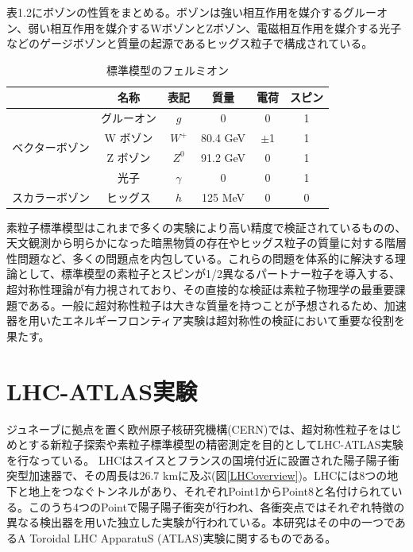 表1.2にボゾンの性質をまとめる。ボゾンは強い相互作用を媒介するグルーオン、弱い相互作用を媒介するWボゾンとZボゾン、電磁相互作用を媒介する光子などのゲージボゾンと質量の起源であるヒッグス粒子で構成されている。

\begin{table}[]
    \centering
    \caption[標準模型のフェルミオン]{標準模型のフェルミオン}
    \label{tab:bozon}

    \begin{tabular}{cccccc}
    \hline
                                                                                           & 名称        & 表記           & 質量                 & 電荷   & スピン \\ 
    \hline\hline
    \multicolumn{1}{c|}{\multirow{4}{*}{ベクターボゾン}}  & グルーオン       & $g$            & 0            & 0 & 1 \\
    \multicolumn{1}{c|}{}                                            &   W ボゾン     & $W^{+}$            & 80.4 GeV            & $\pm$1 & 1 \\ 
    \multicolumn{1}{c|}{}                       & Z ボゾン      & $Z^{0}$           & 91.2 GeV            & 0 & 1 \\
    \multicolumn{1}{c|}{}                                            & 光子    & $\gamma$            & 0             & 0 & 1 \\
    \hline\hline
    \multicolumn{1}{c|}{\multirow{1}{*}{スカラーボゾン}}  & ヒッグス  & $h$    & 125 MeV     & 0    & 0 \\
    \hline
    \end{tabular}
\end{table}


素粒子標準模型はこれまで多くの実験により高い精度で検証されているものの、天文観測から明らかになった暗黒物質の存在やヒッグス粒子の質量に対する階層性問題など、多くの問題点を内包している。これらの問題を体系的に解決する理論として、標準模型の素粒子とスピンが1/2異なるパートナー粒子を導入する、超対称性理論が有力視されており、その直接的な検証は素粒子物理学の最重要課題である。一般に超対称性粒子は大きな質量を持つことが予想されるため、加速器を用いたエネルギーフロンティア実験は超対称性の検証において重要な役割を果たす。
\section{LHC-ATLAS実験}
\label{sec_intro_atlas}

ジュネーブに拠点を置く欧州原子核研究機構(CERN)では、超対称性粒子をはじめとする新粒子探索や素粒子標準模型の精密測定を目的としてLHC-ATLAS実験を行なっている。
LHCはスイスとフランスの国境付近に設置された陽子陽子衝突型加速器で、その周長は26.7 kmに及ぶ(図\ref{LHCoverview})。LHCには8つの地下と地上をつなぐトンネルがあり、それぞれPoint1からPoint8と名付けられている。このうち4つのPointで陽子陽子衝突が行われ、各衝突点ではそれぞれ特徴の異なる検出器を用いた独立した実験が行われている。本研究はその中の一つであるA Toroidal LHC ApparatuS (ATLAS)実験に関するものである。

